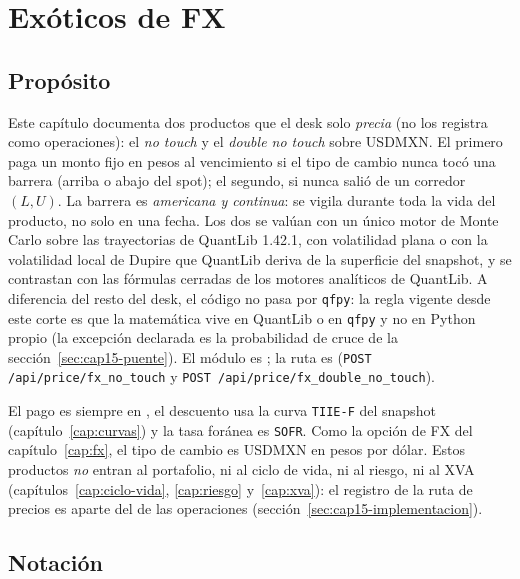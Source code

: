 \chapter{Exóticos de FX}\label{cap:exoticos-fx}

\section{Propósito}\label{sec:cap15-proposito}

Este capítulo documenta dos productos que el desk solo \emph{precia} (no los registra como operaciones): el
\emph{no touch} y el \emph{double no touch} sobre USDMXN. El primero paga un monto fijo en pesos al vencimiento si el
tipo de cambio nunca tocó una barrera (arriba o abajo del spot); el segundo, si nunca salió de un corredor
$(L,U)$. La barrera es \emph{americana y continua}: se vigila durante toda la vida del producto, no solo en una
fecha. Los dos se valúan con un único motor de Monte Carlo sobre las trayectorias de QuantLib 1.42.1, con
volatilidad plana o con la volatilidad local de Dupire que QuantLib deriva de la superficie del snapshot, y se
contrastan con las fórmulas cerradas de los motores analíticos de QuantLib. A diferencia del resto del desk, el
código no pasa por \texttt{qfpy}: la regla vigente desde este corte es que la matemática vive en QuantLib o en
\texttt{qfpy} y no en Python propio (la excepción declarada es la probabilidad de cruce de la
sección~\ref{sec:cap15-puente}). El módulo es
; la ruta es
 (\texttt{POST /api/price/fx\_no\_touch} y
\texttt{POST /api/price/fx\_double\_no\_touch}).

El pago es siempre en \MXN{}, el descuento usa la curva \texttt{TIIE-F} del snapshot
(capítulo~\ref{cap:curvas}) y la tasa foránea es \texttt{SOFR}. Como la opción de FX del capítulo~\ref{cap:fx}, el
tipo de cambio es USDMXN en pesos por dólar. Estos productos \emph{no} entran al portafolio, ni al ciclo de vida,
ni al riesgo, ni al XVA (capítulos~\ref{cap:ciclo-vida}, \ref{cap:riesgo} y~\ref{cap:xva}): el registro de la ruta
de precios es aparte del de las operaciones (sección~\ref{sec:cap15-implementacion}).

\section{Notación}\label{sec:cap15-notacion}


